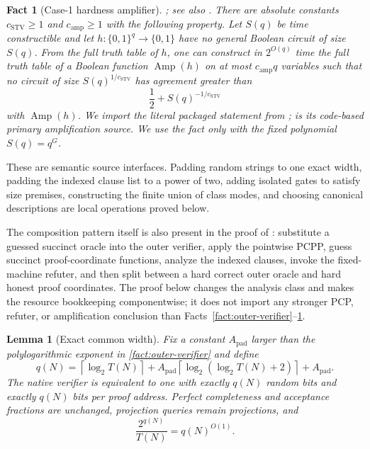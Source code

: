 \documentclass[11pt,letterpaper]{article}
\newcommand{\cref}[1]{\ref{#1}}
\newtheorem{lemma}[theorem]{Lemma}
\newtheorem{fact}[theorem]{Fact}
\theoremstyle{definition}
\theoremstyle{remark}
\begin{document}
\begin{fact}[Case-1 hardness amplifier]
\label{fact:case-one-amplifier}
\cite[Lemma 3.9]{CLW20}; see also \cite[Theorem 24]{STV01}. There are
absolute constants
\(c_{\mathrm{STV}}\ge1\) and \(c_{\mathrm{amp}}\ge1\) with the following
property. Let \(S(q)\) be time constructible and let
\(h:\{0,1\}^q\to\{0,1\}\) have no general Boolean circuit of size
\(S(q)\). From the full truth table of \(h\), one can construct in
\(2^{O(q)}\) time the full truth table of a Boolean function
\(\operatorname{Amp}(h)\) on at most \(c_{\mathrm{amp}}q\) variables
such that no circuit of size \(S(q)^{1/c_{\mathrm{STV}}}\) has agreement
greater than \[
\frac12+S(q)^{-1/c_{\mathrm{STV}}}
\] with \(\operatorname{Amp}(h)\). We import the literal packaged
statement from \cite[Lemma 3.9]{CLW20}; \cite[Theorem 24]{STV01} is its
code-based primary amplification source. We use the fact only with the
fixed polynomial \(S(q)=q^G\).
\end{fact}

These are semantic source interfaces. Padding random strings to one
exact width, padding the indexed clause list to a power of two, adding
isolated gates to satisfy size premises, constructing the finite union
of class modes, and choosing canonical descriptions are local operations
proved below.

The composition pattern itself is also present in the proof of
\cite[Theorem 1.8]{CLW20}: substitute a guessed succinct oracle into the outer
verifier, apply the pointwise PCPP, guess succinct proof-coordinate functions,
analyze the indexed clauses, invoke the fixed-machine refuter, and then
split between a hard correct outer oracle and hard honest proof
coordinates. The proof below changes the analysis class and makes the
resource bookkeeping componentwise; it does not import any stronger PCP,
refuter, or amplification conclusion than
Facts~\ref{fact:outer-verifier}--\ref{fact:case-one-amplifier}.

\begin{lemma}[Exact common width]
\label{lem:common-width}
Fix a constant
\(A_{\mathrm{pad}}\) larger than the polylogarithmic exponent in
\cref{fact:outer-verifier} and define \[
q(N)
{}={}
\left\lceil\log_2T(N)\right\rceil
{}+{}
A_{\mathrm{pad}}
\left\lceil
\log_2(\log_2T(N)+2)
\right\rceil
{}+{}
A_{\mathrm{pad}}.
\tag{C.9.1}
\] The native verifier is equivalent to one with exactly \(q(N)\) random
bits and exactly \(q(N)\) bits per proof address. Perfect completeness
and acceptance fractions are unchanged, projection queries remain
projections, and \[
\frac{2^{q(N)}}{T(N)}
{}={}
q(N)^{O(1)}.
\tag{C.9.2}
\]
\end{lemma}
\end{document}
